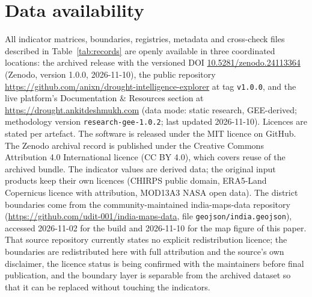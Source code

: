 \documentclass[10pt,a4paper]{article}
\begin{document}
\section*{Data availability}
All indicator matrices, boundaries, registries, metadata and cross-check files described in Table~\ref{tab:records} are openly available in three coordinated locations: the archived release with the versioned DOI \href{https://doi.org/10.5281/zenodo.24113364}{10.5281/zenodo.24113364} (Zenodo, version 1.0.0, 2026-11-10), the public repository \url{https://github.com/anixn/drought-intelligence-explorer} at tag \texttt{v1.0.0}, and the live platform's Documentation \& Resources section at \url{https://drought.ankitdeshmukh.com} (data mode: static research, GEE-derived; methodology version \texttt{research-gee-1.0.2}; last updated 2026-11-10). Licences are stated per artefact. The software is released under the MIT licence on GitHub. The Zenodo archival record is published under the Creative Commons Attribution 4.0 International licence (CC BY 4.0), which covers reuse of the archived bundle. The indicator values are derived data; the original input products keep their own licences (CHIRPS public domain, ERA5-Land Copernicus licence with attribution, MOD13A3 NASA open data). The district boundaries come from the community-maintained india-maps-data repository (\url{https://github.com/udit-001/india-maps-data}, file \texttt{geojson/india.geojson}), accessed 2026-11-02 for the build and 2026-11-10 for the map figure of this paper. That source repository currently states no explicit redistribution licence; the boundaries are redistributed here with full attribution and the source's own disclaimer, the licence status is being confirmed with the maintainers before final publication, and the boundary layer is separable from the archived dataset so that it can be replaced without touching the indicators.
\end{document}
